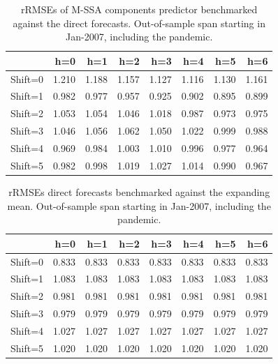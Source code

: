 \documentclass[a4paper]{article}
\begin{document}
\begin{table}[ht]
\centering
\begin{tabular}{rrrrrrrr}
  \hline
 & h=0 & h=1 & h=2 & h=3 & h=4 & h=5 & h=6 \\ 
  \hline
Shift=0 & 1.210 & 1.188 & 1.157 & 1.127 & 1.116 & 1.130 & 1.161 \\ 
  Shift=1 & 0.982 & 0.977 & 0.957 & 0.925 & 0.902 & 0.895 & 0.899 \\ 
  Shift=2 & 1.053 & 1.054 & 1.046 & 1.018 & 0.987 & 0.973 & 0.975 \\ 
  Shift=3 & 1.046 & 1.056 & 1.062 & 1.050 & 1.022 & 0.999 & 0.988 \\ 
  Shift=4 & 0.969 & 0.984 & 1.003 & 1.010 & 0.996 & 0.977 & 0.964 \\ 
  Shift=5 & 0.982 & 0.998 & 1.019 & 1.027 & 1.014 & 0.990 & 0.967 \\ 
   \hline
\end{tabular}
\caption{rRMSEs of M-SSA components predictor benchmarked against the direct forecasts. Out-of-sample span starting in Jan-2007, including the pandemic.} 
\label{rRMSE_mSSA_comp_direct3}
\end{table}%
\begin{table}[ht]
\centering
\begin{tabular}{rrrrrrrr}
  \hline
 & h=0 & h=1 & h=2 & h=3 & h=4 & h=5 & h=6 \\ 
  \hline
Shift=0 & 0.833 & 0.833 & 0.833 & 0.833 & 0.833 & 0.833 & 0.833 \\ 
  Shift=1 & 1.083 & 1.083 & 1.083 & 1.083 & 1.083 & 1.083 & 1.083 \\ 
  Shift=2 & 0.981 & 0.981 & 0.981 & 0.981 & 0.981 & 0.981 & 0.981 \\ 
  Shift=3 & 0.979 & 0.979 & 0.979 & 0.979 & 0.979 & 0.979 & 0.979 \\ 
  Shift=4 & 1.027 & 1.027 & 1.027 & 1.027 & 1.027 & 1.027 & 1.027 \\ 
  Shift=5 & 1.020 & 1.020 & 1.020 & 1.020 & 1.020 & 1.020 & 1.020 \\ 
   \hline
\end{tabular}
\caption{rRMSEs direct forecasts benchmarked against the expanding mean. Out-of-sample span starting in Jan-2007, including the pandemic.} 
\label{rRMSE_mSSA_direct_mean4}
\end{table}
\end{document}
